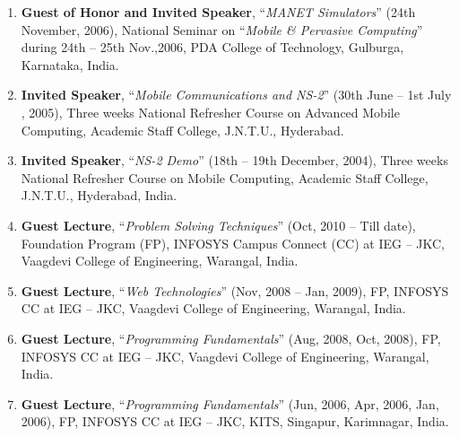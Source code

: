 \begin{enumerate}
\item
\textbf{Guest of Honor and Invited Speaker}, “\textit{MANET Simulators}” (24th November, 2006), National Seminar on “\textit{Mobile \& Pervasive Computing}” during 24th – 25th Nov.,2006, PDA College of Technology, Gulburga, Karnataka, India.

\item
\textbf{Invited Speaker}, “\textit{Mobile Communications and NS-2}” (30th June – 1st  July , 2005), Three weeks National Refresher Course on Advanced Mobile Computing, Academic Staff College, J.N.T.U., Hyderabad.

\item
\textbf{Invited Speaker}, “\textit{NS-2 Demo}” (18th – 19th December, 2004), Three weeks National Refresher Course on Mobile Computing, Academic Staff College, J.N.T.U., Hyderabad, India.

\item
\textbf{Guest Lecture}, “\textit{Problem Solving Techniques}” (Oct, 2010 – Till date), Foundation Program (FP), INFOSYS Campus Connect (CC) at IEG – JKC, Vaagdevi College of Engineering, Warangal, India.

\item
\textbf{Guest Lecture}, “\textit{Web Technologies}” (Nov, 2008 – Jan, 2009), FP, INFOSYS CC at IEG – JKC, Vaagdevi College of Engineering, Warangal, India.

\item
\textbf{Guest Lecture}, “\textit{Programming Fundamentals}” (Aug, 2008, Oct, 2008), FP, INFOSYS CC at IEG – JKC, Vaagdevi College of Engineering, Warangal, India.

\item
\textbf{Guest Lecture}, “\textit{Programming Fundamentals}” (Jun, 2006, Apr, 2006, Jan, 2006), FP, INFOSYS CC at IEG – JKC,  KITS, Singapur, Karimnagar, India.



\end{enumerate}